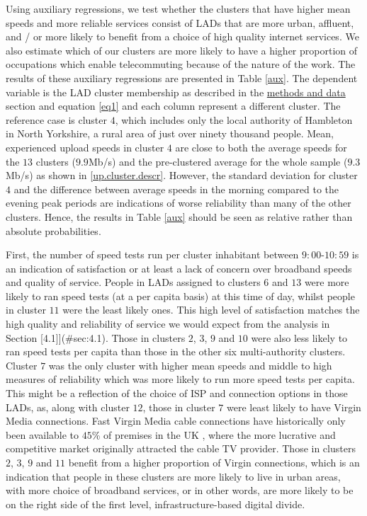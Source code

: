 \documentclass[,]{sagej}
\begin{document}
Using auxiliary regressions, we test whether the clusters that have
higher mean speeds and more reliable services consist of LADs that are
more urban, affluent, and / or more likely to benefit from a choice of
high quality internet services. We also estimate which of our clusters
are more likely to have a higher proportion of occupations which enable
telecommuting because of the nature of the work. The results of these
auxiliary regressions are presented in Table \ref{aux}. The dependent
variable is the LAD cluster membership as described in the
\protect\hyperlink{sec:3}{methods and data} section and equation
\ref{eq1} and each column represent a different cluster. The reference
case is cluster \(4\), which includes only the local authority of
Hambleton in North Yorkshire, a rural area of just over ninety thousand
people. Mean, experienced upload speeds in cluster \(4\) are close to
both the average speeds for the \(13\) clusters (\(9.9\)Mb/s) and the
pre-clustered average for the whole sample (\(9.3\)Mb/s) as shown in
\ref{up.cluster.descr}. However, the standard deviation for cluster
\(4\) and the difference between average speeds in the morning compared
to the evening peak periods are indications of worse reliability than
many of the other clusters. Hence, the results in Table \ref{aux} should
be seen as relative rather than absolute probabilities.

First, the number of speed tests run per cluster inhabitant between
\(9:00\)-\(10:59\) is an indication of satisfaction or at least a lack
of concern over broadband speeds and quality of service. People in LADs
assigned to clusters \(6\) and \(13\) were more likely to ran speed
tests (at a per capita basis) at this time of day, whilst people in
cluster \(11\) were the least likely ones. This high level of
satisfaction matches the high quality and reliability of service we
would expect from the analysis in Section {[}4.1{]}{]}(\#sec:4.1). Those
in clusters \(2\), \(3\), \(9\) and \(10\) were also less likely to ran
speed tests per capita than those in the other six multi-authority
clusters. Cluster \(7\) was the only cluster with higher mean speeds and
middle to high measures of reliability which was more likely to run more
speed tests per capita. This might be a reflection of the choice of ISP
and connection options in those LADs, as, along with cluster \(12\),
those in cluster \(7\) were least likely to have Virgin Media
connections. Fast Virgin Media cable connections have historically only
been available to \(45\)\% of premises in the UK \citep{ofcom2016},
where the more lucrative and competitive market originally attracted the
cable TV provider. Those in clusters \(2\), \(3\), \(9\) and \(11\)
benefit from a higher proportion of Virgin connections, which is an
indication that people in these clusters are more likely to live in
urban areas, with more choice of broadband services, or in other words,
are more likely to be on the right side of the first level,
infrastructure-based digital divide.
\end{document}
